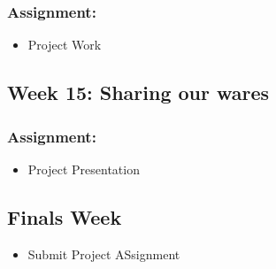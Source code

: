 \documentclass[]{article}
\begin{document}
\subsubsection{Assignment:}\label{assignment-7}

\begin{itemize}
\itemsep1pt\parskip0pt
\item
  Project Work
\end{itemize}

\subsection{Week 15: Sharing our wares}\label{week-15-sharing-our-wares}

\subsubsection{Assignment:}\label{assignment-8}

\begin{itemize}
\itemsep1pt\parskip0pt
\item
  Project Presentation
\end{itemize}

\subsection{Finals Week}\label{finals-week}

\begin{itemize}
\itemsep1pt\parskip0pt
\item
  Submit Project ASsignment
\end{itemize}
\end{document}
